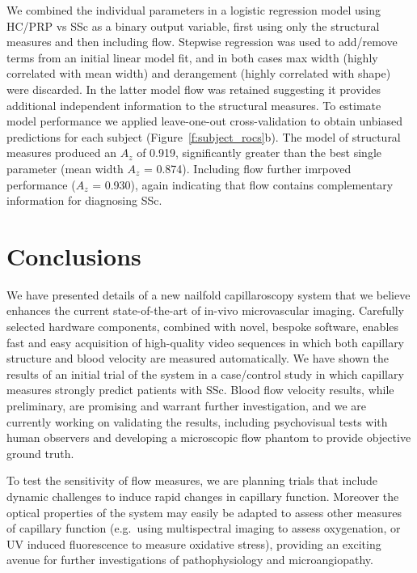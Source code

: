 \documentclass[runningheads,a4paper]{llncs}
\newcommand{\fref}[1]{Figure~\ref{#1}}
\def\eg{e.g.}
\begin{document}
We combined the individual parameters in a logistic regression model using  HC/PRP vs SSc as a binary output variable, first using only the structural measures and then including flow. Stepwise regression was used to add/remove terms from an initial linear model fit, and in both cases max width (highly correlated with mean width) and derangement (highly correlated with shape) were discarded. In the latter model flow was retained suggesting it provides additional independent information to the structural measures. To estimate model performance we applied leave-one-out cross-validation to obtain unbiased predictions for each subject (\fref{f:subject_rocs}b). The model of structural measures produced an $A_z$ of 0.919, significantly greater than the best single parameter (mean width $A_z$ = 0.874). Including flow further imrpoved performance ($A_z$ = 0.930), again indicating that flow contains complementary information for diagnosing SSc.
%
\section{Conclusions}
\label{s:conclusions}
We have presented details of a new nailfold capillaroscopy system that we believe enhances the current state-of-the-art of in-vivo microvascular imaging. Carefully selected hardware components, combined with novel, bespoke software, enables fast and easy acquisition of high-quality video sequences in which both capillary structure and blood velocity are measured automatically. We have shown the results of an initial trial of the system in a case/control study in which capillary measures strongly predict patients with SSc. Blood flow velocity results, while preliminary, are promising and warrant further investigation, and we are currently working on validating the results, including psychovisual tests with human observers and  developing a microscopic flow phantom to provide objective ground truth.

To test the sensitivity of flow measures, we are planning trials that include dynamic challenges to induce rapid changes in capillary function. Moreover the optical properties of the system may easily be adapted to assess other measures of capillary function (\eg~using multispectral imaging to assess oxygenation, or UV induced fluorescence  to measure oxidative stress), providing an exciting avenue for further investigations of pathophysiology and microangiopathy. 




\end{document}
